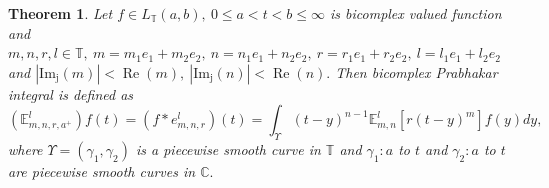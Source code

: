 \documentclass[a4paper,12pt]{article}
\newtheorem{theorem}{Theorem}[section]
\theoremstyle{remark}
\begin{document}
\begin{theorem}
	Let $f\in L_{\mathbb{T}}(a,b),~0\le a<t<b\le\infty$  is bicomplex valued function and  $m,n,r,l \in \mathbb{T},~m= m_1e_1+m_2e_2,  ~ n=n_1e_1+n_2e_2,~ r=r_1e_1+r_2e_2,~l=l_1e_1+l_2e_2$ and $|\operatorname{Im_j}(m)|<\operatorname{Re}(m),~|\operatorname{Im_j}(n)|<\operatorname{Re}(n).$ Then   bicomplex Prabhakar integral  is defined as 
\begin{equation}\label{eq:bc p int1}	(\mathbb{E}_{m,n,r,a^+}^l)f(t)=(f*e_{m,n,r}^l)(t)=\int_{\varUpsilon}(t-y)^{n-1}\mathbb{E}_{m,n}^l[{r(t-y)^m}]f(y)dy,
	\end{equation}
	where $\varUpsilon =(\gamma_1, \gamma_2)$ is a piecewise smooth  curve in $\mathbb{T}$ and 	$\gamma_1:a $ to $t$ and $\gamma_2:a $ to $t$ are piecewise smooth curves in $\mathbb{C}.$
	\end{theorem}
\end{document}
